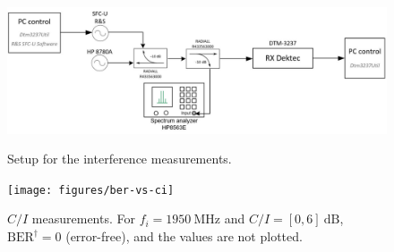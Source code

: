 \documentclass[conference,10pt,a4paper]{IEEEtran}%
\begin{document}
\begin{figure}[tb]
	\centering
	\includegraphics[width=\columnwidth]{figures/interference-dektec-setup}
	\caption{Setup for the interference measurements.}
	\label{fig:interference-dektec-setup}
	\vspace{\baselineskip}
	\texttt{[image: figures/ber-vs-ci]}
	\caption{$C/I$ measurements. For $f_i = \SI{1950}{\mega\Hz}$ and $C/I = [0,6]~\si{\deci\bel}$, $\text{BER}^\dagger = 0$ (error-free), and the values are not plotted.}
	\label{fig:ci-meas}
\end{figure}
\end{document}
